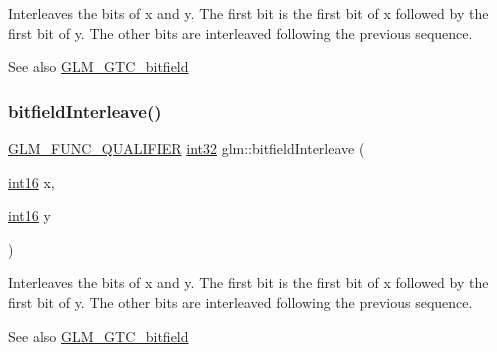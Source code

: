 Interleaves the bits of x and y. The first bit is the first bit of x followed by the first bit of y. The other bits are interleaved following the previous sequence.

\begin{DoxySeeAlso}{See also}
\hyperlink{group__gtc__bitfield}{G\+L\+M\+\_\+\+G\+T\+C\+\_\+bitfield} 
\end{DoxySeeAlso}
\mbox{\label{group__gtc__bitfield_ga1a0264598647ae00a596865af4e1e878}} 
\subsubsection{\texorpdfstring{bitfield\+Interleave()}{bitfieldInterleave()}\hspace{0.1cm}{\footnotesize\ttfamily [3/16]}}
{\footnotesize\ttfamily \hyperlink{setup_8hpp_a33fdea6f91c5f834105f7415e2a64407}{G\+L\+M\+\_\+\+F\+U\+N\+C\+\_\+\+Q\+U\+A\+L\+I\+F\+I\+ER} \hyperlink{group__gtc__type__precision_ga632d8b25f6b61659f39ea4321fab92a4}{int32} glm\+::bitfield\+Interleave (\begin{DoxyParamCaption}\item[{\hyperlink{group__gtc__type__precision_ga2945a61d12771f8954994fcddf02b021}{int16}}]{x,  }\item[{\hyperlink{group__gtc__type__precision_ga2945a61d12771f8954994fcddf02b021}{int16}}]{y }\end{DoxyParamCaption})}

Interleaves the bits of x and y. The first bit is the first bit of x followed by the first bit of y. The other bits are interleaved following the previous sequence.

\begin{DoxySeeAlso}{See also}
\hyperlink{group__gtc__bitfield}{G\+L\+M\+\_\+\+G\+T\+C\+\_\+bitfield} 
\end{DoxySeeAlso}
\mbox{\label{group__gtc__bitfield_ga19ef8360379483e3ee245e89cb62ff93}} 
